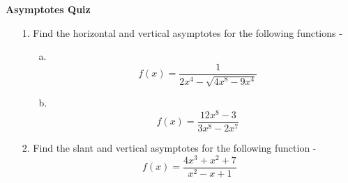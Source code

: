 \documentclass[11pt]{article}
\begin{document}

\centerline{\textbf{\Large{Asymptotes Quiz}}}

\vspace{0.2in}
 

\begin{enumerate}

\item[1.] Find the horizontal and vertical asymptotes for the following functions - 
\begin{enumerate}
	\item[a.] $$f(x) = \frac{1}{2x^4 - \sqrt{4x^8 - 9x^4}}$$ 
	\item[b.] $$ f(x) = \frac{12 x^8 - 3}{3x^8 -2x^7}$$ 
\end{enumerate}
	
\item[2.] Find the slant and vertical asymptotes for the following function -
$$ f(x) = \frac{4x^3 + x^2 + 7}{x^2 - x + 1}$$ 

\end{enumerate}
 
\end{document}
